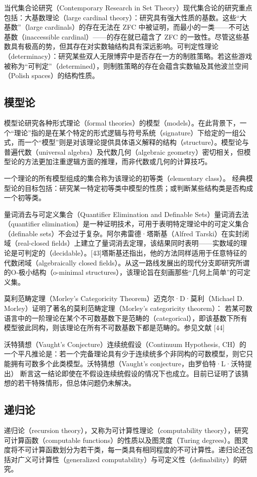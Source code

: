 当代集合论研究（Contemporary Research in Set Theory）现代集合论的研究重点包括：大基数理论（large cardinal theory）：研究具有强大性质的基数。这些“大基数”（large cardinals）的存在无法在 ZFC 中被证明，而最小的一类——不可达基数（inaccessible cardinal）——的存在就已蕴含了 ZFC 的一致性。尽管这些基数具有极高的势，但其存在对实数轴结构具有深远影响。可判定性理论（determinacy）：研究某些双人无限博弈中是否存在一方的制胜策略。若这些游戏被称为“可判定”（determined），则制胜策略的存在会蕴含实数轴及其他波兰空间（Polish spaces）的结构性质。
\subsection{模型论}
模型论研究各种形式理论（formal theories）的模型（models）。在此背景下，一个“理论”指的是在某个特定的形式逻辑与符号系统（signature）下给定的一组公式，而一个“模型”则是对该理论提供具体语义解释的结构（structure）。模型论与普遍代数（universal algebra）及代数几何（algebraic geometry）密切相关，但模型论的方法更加注重逻辑方面的推理，而非代数或几何的计算技巧。

一个理论的所有模型组成的集合称为该理论的初等类（elementary class）。  
经典模型论的目标包括：研究某一特定初等类中模型的性质；或判断某些结构类是否构成一个初等类。

量词消去与可定义集合（Quantifier Elimination and Definable Sets）量词消去法（quantifier elimination）是一种证明技术，可用于表明特定理论中的可定义集合（definable sets）不会过于复杂。阿尔弗雷德·塔斯基（Alfred Tarski）在实封闭域（real-closed fields）上建立了量词消去定理，该结果同时表明——实数域的理论是可判定的（decidable）。[43]塔斯基还指出，他的方法同样适用于任意特征的代数闭域（algebraically closed fields）。从这一路线发展出的现代分支即研究所谓的O-极小结构（o-minimal structures），该理论旨在刻画那些“几何上简单”的可定义集。

莫利范畴定理（Morley’s Categoricity Theorem）迈克尔·D·莫利（Michael D. Morley）证明了著名的莫利范畴定理（Morley’s categoricity theorem）： 若某可数语言中的一阶理论在某个不可数基数下是范畴的（categorical），即该基数下所有模型彼此同构，则该理论在所有不可数基数下都是范畴的。参见文献 [44]

沃特猜想（Vaught’s Conjecture）连续统假设（Continuum Hypothesis, CH）的一个平凡推论是：若一个完备理论具有少于连续统多个非同构的可数模型，则它只能拥有可数多个此类模型。沃特猜想（Vaught’s conjecture，由罗伯特·L·沃特提出）  断言这一结论即使在不假设连续统假设的情况下也成立。目前已证明了该猜想的若干特殊情形，但总体问题仍未解决。
\subsection{递归论}
递归论（recursion theory），又称为可计算性理论（computability theory），研究可计算函数（computable functions）的性质以及图灵度（Turing degrees）。图灵度将不可计算函数划分为若干类，每一类具有相同程度的不可计算性。递归论还包括对广义可计算性（generalized computability）与可定义性（definability）的研究。  

